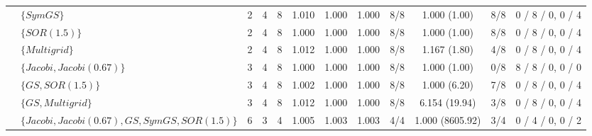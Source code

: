 {\begin{tabular}{llcccccccccc}
 & $\{SymGS\}$ & 2 & 4 & 8 & 1.010 & 1.000 & 1.000 & 8/8 & 1.000 (1.00) & 8/8 & 0 / 8 / 0, 0 / 4 \\
 & $\{SOR (1.5)\}$ & 2 & 4 & 8 & 1.000 & 1.000 & 1.000 & 8/8 & 1.000 (1.00) & 8/8 & 0 / 8 / 0, 0 / 4 \\
 & $\{Multigrid\}$ & 2 & 4 & 8 & 1.012 & 1.000 & 1.000 & 8/8 & 1.167 (1.80) & 4/8 & 0 / 8 / 0, 0 / 4 \\
 & $\{Jacobi, Jacobi (0.67)\}$ & 3 & 4 & 8 & 1.000 & 1.000 & 1.000 & 8/8 & 1.000 (1.00) & 0/8 & 8 / 8 / 0, 0 / 0 \\
 & $\{GS, SOR (1.5)\}$ & 3 & 4 & 8 & 1.002 & 1.000 & 1.000 & 8/8 & 1.000 (6.20) & 7/8 & 0 / 8 / 0, 0 / 4 \\
 & $\{GS, Multigrid\}$ & 3 & 4 & 8 & 1.012 & 1.000 & 1.000 & 8/8 & 6.154 (19.94) & 3/8 & 0 / 8 / 0, 0 / 4 \\
 & $\{Jacobi, Jacobi (0.67), GS, SymGS, SOR (1.5)\}$ & 6 & 3 & 4 & 1.005 & 1.003 & 1.003 & 4/4 & 1.000 (8605.92) & 3/4 & 0 / 4 / 0, 0 / 2 \\
\bottomrule
\end{tabular}}
\newcommand{\caThmMuMax}{1.104}
\newcommand{\caThmHolds}{296/296}
\newcommand{\caThmFloor}{80}
\newcommand{\caThmPlainDiff}{0}
\newcommand{\caThmViol}{0}
\newcommand{\caThmViolAll}{0}
\newcommand{\caThmMaxRatio}{8606.0}
\newcommand{\caThmResolved}{216}
\newcommand{\caThmAlphaGreedyMax}{1.003}
\newcommand{\caThmAlphaAllMax}{1.003}
\newcommand{\caThmPremises}{183/296}
\newcommand{\caThmExpand}{38}
\newcommand{\caThmExpandAll}{174}
\newcommand{\caThmClip}{6}
\newcommand{\caThmN}{296}
